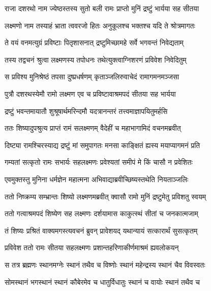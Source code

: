 \twolineshloka
{राजा दशरथो नाम ज्येष्ठस्तस्य सुतो बली}
{रामः प्राप्तो मुनिं द्रष्टुं भार्यया सह सीतया} %

\twolineshloka
{लक्ष्मणो नाम तस्याहं भ्राता त्ववरजो हितः}
{अनुकूलश्च भक्तश्च यदि ते श्रोत्रमागतः} %

\twolineshloka
{ते वयं वनमत्युग्रं प्रविष्टाः पितृशासनात्}
{द्रष्टुमिच्छामहे सर्वे भगवन्तं निवेद्यताम्} %

\twolineshloka
{तस्य तद्वचनं श्रुत्वा लक्ष्मणस्य तपोधनः}
{तथेत्युक्त्वाग्निशरणं प्रविवेश निवेदितुम्} %

\twolineshloka
{स प्रविश्य मुनिश्रेष्ठं तपसा दुष्प्रधर्षणम्}
{कृताञ्जलिरुवाचेदं रामागमनमञ्जसा} %

\twolineshloka
{पुत्रौ दशरथस्येमौ रामो लक्ष्मण एव च}
{प्रविष्टावाश्रमपदं सीतया सह भार्यया} %

\twolineshloka
{द्रष्टुं भवन्तमायातौ शुश्रूषार्थमरिन्दमौ}
{यदत्रानन्तरं तत्त्वमाज्ञापयितुमर्हसि} %

\twolineshloka
{ततः शिष्यादुपश्रुत्य प्राप्तं रामं सलक्ष्मणम्}
{वैदेहीं च महाभागामिदं वचनमब्रवीत्} %

\twolineshloka
{दिष्ट्या रामश्चिरस्याद्य द्रष्टुं मां समुपागतः}
{मनसा काङ्क्षितं ह्यस्य मयाप्यागमनं प्रति} %

\twolineshloka
{गम्यतां सत्कृतो रामः सभार्यः सहलक्ष्मणः}
{प्रवेश्यतां समीपं मे किं चासौ न प्रवेशितः} %

\twolineshloka
{एवमुक्तस्तु मुनिना धर्मज्ञेन महात्मना}
{अभिवाद्याब्रवीच्छिष्यस्तथेति नियताञ्जलिः} %

\twolineshloka
{ततो निष्क्रम्य सम्भ्रान्तः शिष्यो लक्ष्मणमब्रवीत्}
{क्वासौ रामो मुनिं द्रष्टुमेतु प्रविशतु स्वयम्} %

\twolineshloka
{ततो गत्वाश्रमपदं शिष्येण सह लक्ष्मणः}
{दर्शयामास काकुत्स्थं सीतां च जनकात्मजाम्} %

\twolineshloka
{तं शिष्यः प्रश्रितं वाक्यमगस्त्यवचनं ब्रुवन्}
{प्रावेशयद् यथान्यायं सत्कारार्थं सुसत्कृतम्} %

\twolineshloka
{प्रविवेश ततो रामः सीतया सहलक्ष्मणः}
{प्रशान्तहरिणाकीर्णमाश्रमं ह्यवलोकयन्} %

\twolineshloka
{स तत्र ब्रह्मणः स्थानमग्नेः स्थानं तथैव च}
{विष्णोः स्थानं महेन्द्रस्य स्थानं चैव विवस्वतः} %

\twolineshloka
{सोमस्थानं भगस्थानं स्थानं कौबेरमेव च}
{धातुर्विधातुः स्थानं च वायोः स्थानं तथैव च} %

